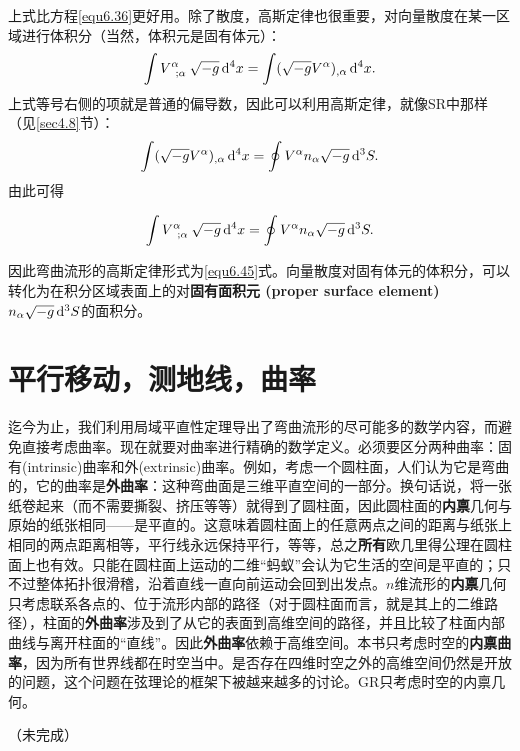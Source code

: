 上式比方程\eqref{equ6.36}更好用。除了散度，高斯定律也很重要，对向量散度在某一区域进行体积分（当然，体积元是固有体元）：
\begin{equation}
    \int V\indices{^\alpha_{; \alpha}}  \sqrt{-g} \, \rd^4 x = \int (\sqrt{-g} V^\alpha)_{, \alpha} \, \rd^4 x.
\label{equ6.43}
\end{equation}
上式等号右侧的项就是普通的偏导数，因此可以利用高斯定律，就像SR中那样（见\ref{sec4.8}节）：
\begin{equation}
    \int (\sqrt{-g} V^\alpha)_{, \alpha} \, \mathrm{d}^4 x = \oint V^\alpha n_\alpha \sqrt{-g} \, \mathrm{d}^3 S.
\label{equ6.44}
\end{equation}
由此可得
\begin{shaded}
\begin{equation}
    \int V\indices{^\alpha_{; \alpha}}  \sqrt{-g} \, \rd^4 x = \oint V^\alpha n_\alpha \sqrt{-g} \,\rd^3 S.
\label{equ6.45}
\end{equation}
\end{shaded}
因此弯曲流形的高斯定律形式为\eqref{equ6.45}式。向量散度对固有体元的体积分，可以转化为在积分区域表面上的对\textbf{固有面积元 (proper surface element)}$n_\alpha \sqrt{-g} \, \mathrm{d}^3 S$的面积分。

\section{平行移动，测地线，曲率}
\label{sec6.4}
迄今为止，我们利用局域平直性定理导出了弯曲流形的尽可能多的数学内容，而避免直接考虑曲率。现在就要对曲率进行精确的数学定义。必须要区分两种曲率：固有(intrinsic)曲率和外(extrinsic)曲率。例如，考虑一个圆柱面，人们认为它是弯曲的，它的曲率是\textbf{外曲率}：这种弯曲面是三维平直空间的一部分。换句话说，将一张纸卷起来（而不需要撕裂、挤压等等）就得到了圆柱面，因此圆柱面的\textbf{内禀}几何与原始的纸张相同——是平直的。这意味着圆柱面上的任意两点之间的距离与纸张上相同的两点距离相等，平行线永远保持平行，等等，总之\textbf{所有}欧几里得公理在圆柱面上也有效。只能在圆柱面上运动的二维“蚂蚁”会认为它生活的空间是平直的；只不过整体拓扑很滑稽，沿着直线一直向前运动会回到出发点。$n$维流形的\textbf{内禀}几何只考虑联系各点的、位于流形内部的路径（对于圆柱面而言，就是其上的二维路径），柱面的\textbf{外曲率}涉及到了从它的表面到高维空间的路径，并且比较了柱面内部曲线与离开柱面的“直线”。因此\textbf{外曲率}依赖于高维空间。本书只考虑时空的\textbf{内禀曲率}，因为所有世界线都在时空当中。是否存在四维时空之外的高维空间仍然是开放的问题，这个问题在弦理论的框架下被越来越多的讨论。GR只考虑时空的内禀几何。

（未完成）



